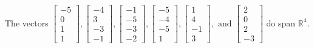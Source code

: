 \begin{exercise}
\begin{exerciseStatement}
  \end{exerciseStatement}
  \begin{exerciseAnswer}
   The vectors \(\left[\begin{array}{r}
-5 \\
0 \\
1 \\
1
\end{array}\right] , \left[\begin{array}{r}
-4 \\
3 \\
-3 \\
-1
\end{array}\right] , \left[\begin{array}{r}
-1 \\
-5 \\
-3 \\
-2
\end{array}\right] , \left[\begin{array}{r}
-5 \\
-4 \\
-5 \\
1
\end{array}\right] , \left[\begin{array}{r}
1 \\
4 \\
-1 \\
3
\end{array}\right] , \text{ and } \left[\begin{array}{r}
2 \\
0 \\
2 \\
-3
\end{array}\right]\) 
  	 do  
	span \(\mathbb{R}^4\).
  


  \end{exerciseAnswer}
\end{exercise}